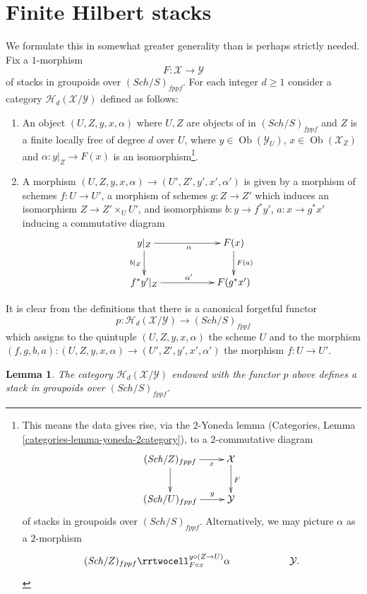 \documentclass{stacks-project}
\theoremstyle{plain}
\newtheorem{lemma}[subsection]{Lemma}
\theoremstyle{definition}
\theoremstyle{remark}
\numberwithin{equation}{subsection}
\def\Sch{\mathit{Sch}}
\def\Ob{\mathop{\mathrm{Ob}}\nolimits}
\begin{document}
\section{Finite Hilbert stacks}
\label{section-hilbert-d-stack}

\noindent
We formulate this in somewhat greater generality than is perhaps strictly
needed. Fix a $1$-morphism
$$
F : \mathcal{X} \longrightarrow \mathcal{Y}
$$
of stacks in groupoids over $(\Sch/S)_{fppf}$. For each integer
$d \geq 1$ consider a category $\mathcal{H}_d(\mathcal{X}/\mathcal{Y})$
defined as follows:
\begin{enumerate}
\item An object $(U, Z, y, x, \alpha)$ where $U, Z$ are objects of
in $(\Sch/S)_{fppf}$ and $Z$ is a finite locally free of degree
$d$ over $U$, where
$y \in \Ob(\mathcal{Y}_U)$, $x \in \Ob(\mathcal{X}_Z)$
and $\alpha : y|_Z \to F(x)$ is an isomorphism\footnote{
This means the data gives rise, via the $2$-Yoneda lemma
(Categories, Lemma \ref{categories-lemma-yoneda-2category}), to a
$2$-commutative diagram
$$
\xymatrix{
(\Sch/Z)_{fppf} \ar[r]_-x \ar[d] & \mathcal{X} \ar[d]^F \\
(\Sch/U)_{fppf} \ar[r]^-y & \mathcal{Y}
}
$$
of stacks in groupoids over $(\Sch/S)_{fppf}$.
Alternatively, we may picture $\alpha$ as a $2$-morphism
$$
\xymatrix{
(\Sch/Z)_{fppf}
\rrtwocell^{y \circ (Z \to U)}_{F \circ x}{\alpha} & &
\mathcal{Y}.
}
$$
}.
\item A morphism $(U, Z, y, x, \alpha) \to (U', Z', y', x', \alpha')$ is
given by a morphism of schemes $f : U \to U'$, a morphism of schemes
$g : Z \to Z'$ which induces an isomorphism $Z \to Z' \times_U U'$,
and isomorphisms $b : y \to f^*y'$, $a : x \to g^*x'$ inducing a commutative
diagram
$$
\xymatrix{
y|_Z \ar[rr]_\alpha \ar[d]_{b|_Z} & &
F(x) \ar[d]^{F(a)} \\
f^*y'|_Z \ar[rr]^{\alpha'} & &
F(g^*x') \\
}
$$
\end{enumerate}
It is clear from the definitions that there is a canonical
forgetful functor
$$
p :
\mathcal{H}_d(\mathcal{X}/\mathcal{Y})
\longrightarrow
(\Sch/S)_{fppf}
$$
which assigns to the quintuple $(U, Z, y, x, \alpha)$ the scheme $U$
and to the morphism
$(f, g, b, a) : (U, Z, y, x, \alpha) \to (U', Z', y', x', \alpha')$
the morphism $f : U \to U'$.

\begin{lemma}
\label{lemma-hilbert-d-stack}
The category $\mathcal{H}_d(\mathcal{X}/\mathcal{Y})$ endowed with
the functor $p$ above defines a stack in groupoids over
$(\Sch/S)_{fppf}$.
\end{lemma}
\end{document}

